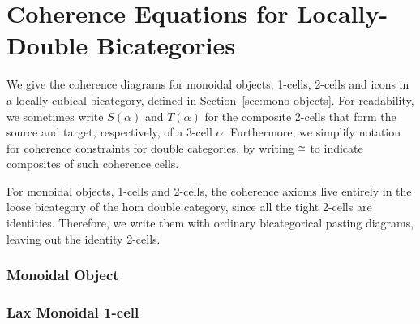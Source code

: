 \section{Coherence Equations for Locally-Double Bicategories}
\label{ap:coherence}

We give the coherence diagrams for monoidal objects, 1-cells, 2-cells and icons in a locally cubical bicategory, defined in Section~\ref{sec:mono-objects}. For readability, we sometimes write $S(\alpha)$ and $T(\alpha)$ for the composite 2-cells that form the source and target, respectively, of a 3-cell $\alpha$.
Furthermore, we simplify notation for coherence constraints for double categories, by writing $\cong$ to indicate composites of such coherence cells.

For monoidal objects, 1-cells and 2-cells, the coherence axioms  live entirely in the loose bicategory of the hom double category, since all the tight 2-cells are identities. Therefore, we write them with
ordinary bicategorical pasting diagrams, leaving out the identity
2-cells.  

\subsubsection*{Monoidal Object}

 \newpage
 \newpage
 \newpage


\subsubsection*{Lax Monoidal 1-cell}

 \newpage
 \newpage



%


